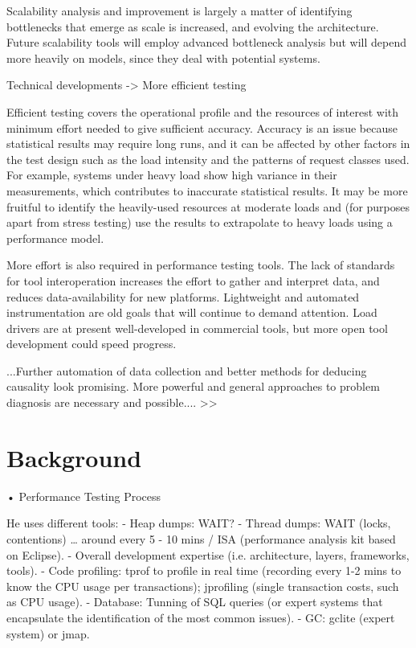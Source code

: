 \documentclass[runningheads,a4paper]{llncs}
\begin{document}
Scalability analysis and improvement is largely a
matter of identifying bottlenecks that emerge as scale
is increased, and evolving the architecture. Future
scalability tools will employ advanced bottleneck
analysis but will depend more heavily on models, since
they deal with potential systems.

Technical developments -> More efficient testing

Efficient testing covers the operational profile and
the resources of interest with minimum effort needed
to give sufficient accuracy. Accuracy is an issue
because statistical results may require long runs, and it
can be affected by other factors in the test design such
as the load intensity and the patterns of request classes
used. For example, systems under heavy load show
high variance in their measurements, which contributes
to inaccurate statistical results. It may be more fruitful
to identify the heavily-used resources at moderate
loads and (for purposes apart from stress testing) use
the results to extrapolate to heavy loads using a
performance model.

More effort is also required in performance testing
tools. The lack of standards for tool interoperation
increases the effort to gather and interpret data, and
reduces data-availability for new platforms.
Lightweight and automated instrumentation are old
goals that will continue to demand attention. Load
drivers are at present well-developed in commercial
tools, but more open tool development could speed
progress.


...Further automation
of data collection and better methods for deducing
causality look promising. More powerful and general
approaches to problem diagnosis are necessary and
possible....
>>


\section{Background}

•	Performance Testing Process

He uses different tools:
- Heap dumps: WAIT?
- Thread dumps: WAIT (locks, contentions) … around every 5 - 10 mins / ISA (performance analysis kit based on Eclipse).
- Overall development expertise (i.e. architecture, layers, frameworks, tools).
- Code profiling: tprof to profile in real time (recording every 1-2 mins to know the CPU usage per transactions); jprofiling (single transaction costs, such as CPU usage).
- Database: Tunning of SQL queries (or expert systems that encapsulate the identification of the most common issues).
- GC: gclite (expert system) or jmap.
\end{document}
